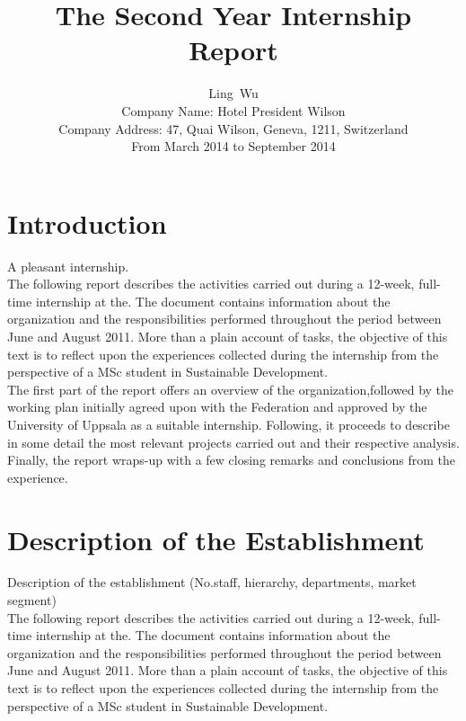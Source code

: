 \documentclass[12pt,onecolumn,a4paper]{IEEEtran}
\begin{document}
\linespread{1.5}
\title{The Second Year Internship Report}
\author{Ling~Wu\\
  Company Name: Hotel President Wilson\\
  Company Address: 47, Quai Wilson, Geneva, 1211, Switzerland\\
  From March 2014 to September 2014\\}
\maketitle

\IEEEpeerreviewmaketitle
\thispagestyle{empty}
\newpage

\tableofcontents
\thispagestyle{empty}

\newpage

\clearpage
{} 
\section{\textbf{Introduction}}

A pleasant internship.\\

The following report describes the activities carried out during a 12-week, full-time internship at the. The document contains information about the organization and the responsibilities performed throughout the period between June and August 2011. More than a plain account of tasks, the objective of this text is to reflect upon the experiences collected during the internship from the perspective of a MSc student in Sustainable Development.\\

The first part of the report offers an overview of the organization,followed by the working plan initially agreed upon with the Federation and approved by the University of Uppsala as a suitable internship. Following, it proceeds to describe in some detail the most relevant projects carried out and their respective analysis. Finally, the report wraps-up with a few closing remarks and conclusions from the experience.

\newpage
\section{\textbf{Description of the Establishment}}
Description of the establishment (No.staff, hierarchy, departments, market segment)\\

The following report describes the activities carried out during a 12-week, full-time internship at the. The document contains information about the organization and the responsibilities performed throughout the period between June and August 2011. More than a plain account of tasks, the objective of this text is to reflect upon the experiences collected during the internship from the perspective of a MSc student in
Sustainable Development.\\
\end{document}
